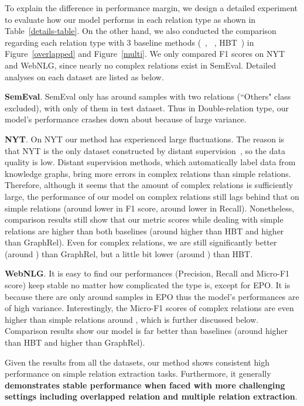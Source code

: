 \documentclass[11pt,a4paper]{article}
\begin{document}
To explain the difference in performance margin, we design a detailed experiment to evaluate how our model performs in each relation type as shown in Table~\ref{details-table}. On the other hand, we also conducted the comparison regarding each relation type with 3 baseline methods  (~\cite{fu2019graphrel},  ~\cite{fu2019graphrel},
HBT~\cite{wei2019novel}) in Figure~\ref{overlapped} and Figure~\ref{multi}. We only compared F1 scores on NYT and WebNLG, since nearly no complex relations exist in SemEval. Detailed analyses on each dataset are listed as below.


\textbf{SemEval}. SemEval only has around  samples with two relations (``Others" class excluded), with only  of them in test dataset. Thus in Double-relation type, our model's performance crashes down about  because of large variance. 

\textbf{NYT}. On NYT our method has experienced large fluctuations. The reason is that NYT is the only dataset constructed by distant supervision~\cite{mintz2009distant}, so the data quality is low. Distant supervision methods, which automatically label data from knowledge graphs, bring more errors in complex relations than simple relations. Therefore, although it seems that the amount of complex relations is sufficiently large, the performance of our model on complex relations still lags behind that on simple relations (around  lower in F1 score, around  lower in Recall). Nonetheless, comparison results still show that our metric scores while dealing with simple relations are higher than both baselines (around  higher than HBT and  higher than GraphRel). Even for complex relations, we are still significantly better (around ) than GraphRel, but a little bit lower (around ) than HBT.  


\textbf{WebNLG}. It is easy to find our performances (Precision, Recall and Micro-F1 score) keep stable no matter how complicated the type is, except for EPO. It is because there are only around  samples in EPO thus the model's performances are of high variance. Interestingly, the Micro-F1 scores of complex relations are even higher than simple relations around , which is further discussed below. Comparison results show our model is far better than baselines (around  higher than HBT and  higher than GraphRel).

Given the results from all the datasets, our method shows consistent high performance on simple relation extraction tasks. Furthermore, it generally \textbf{demonstrates stable performance when faced with more challenging settings including overlapped relation and multiple relation extraction}.
\end{document}
